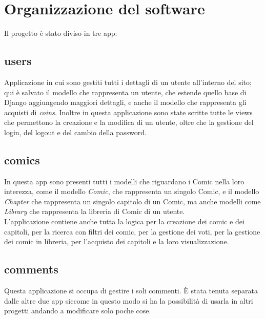 \section{Organizzazione del software}
Il progetto è stato diviso in tre app:

\subsection{users}
Applicazione in cui sono gestiti tutti i dettagli di un utente all’interno del sito;
qui è salvato il modello che rappresenta un utente, che estende quello base di
Django aggiungendo maggiori dettagli, e anche il modello che rappresenta gli acquisti di \textit{coins}.
Inoltre in questa applicazione sono state scritte tutte le views che permettono
la creazione e la modifica di un utente, oltre che la gestione del login, del logout e del cambio della password.

\subsection{comics}
In questa app sono presenti tutti i modelli che riguardano i Comic nella loro interezza,
come il modello \textit{Comic}, che rappresenta un singolo Comic, e il modello \textit{Chapter}
che rappresenta un singolo capitolo di un Comic, ma anche modelli come \textit{Library} che rappresenta
la libreria di Comic di un utente.
\\L'applicazione contiene anche tutta la logica per la creazione dei comic e dei capitoli,
per la ricerca con filtri dei comic, per la gestione dei voti, per la gestione dei comic in libreria,
per l'acquisto dei capitoli e la loro visualizzazione.


\subsection{comments}
Questa applicazione si occupa di gestire i soli commenti.
È stata tenuta separata dalle altre due app siccome in questo modo si ha la possibilità
di usarla in altri progetti andando a modificare solo poche cose.